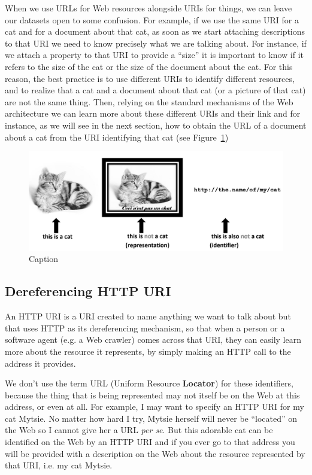 When we use URLs for Web resources alongside URIs for things, we can
leave our datasets open to some confusion. For example, if we use the
same URI for a cat and for a document about that cat, as soon as we
start attaching descriptions to that URI we need to know precisely what
we are talking about. For instance, if we attach a property to that URI
to provide a ``size'' it is important to know if it refers to the size of the
cat or the size of the document about the cat. For this reason, the best
practice is to use different URIs to identify different resources, and
to realize that a cat and a document about that cat (or a picture of
that cat) are not the same thing. Then, relying on the standard
mechanisms of the Web architecture we can learn more about these
different URIs and their link and for instance, as we will see in the
next section, how to obtain the URL of a document about a cat from the
URI identifying that cat (see Figure~\ref{fig:ch5.cats})

\begin{figure}
    \centering
    \includegraphics[width=5in]{media/ch5/WebAndCats.jpg}
    \caption{Caption}
    \label{fig:ch5.cats}
\end{figure}

\hypertarget{dereferencing-http-uri}{%
\subsection{Dereferencing HTTP URI }\label{dereferencing-http-uri}}

An HTTP URI is a URI created to name anything we want to talk about but
that uses  HTTP   as its dereferencing mechanism,  so that when a person or a
software agent (e.g. a Web crawler) comes across that URI, they can easily learn more
about the resource it represents,  by simply making an HTTP call
to the address it provides.

We don't use the term URL (Uniform Resource \textbf{Locator}) for these identifiers, because the thing that is being
represented may not itself be on the Web at this address, or even at all. For example, I
may want to specify an HTTP URI for my cat Mytsie. No matter how hard I
try, Mytsie herself will never be ``located'' on the Web so I cannot give
her a URL \emph{per se}. But this adorable cat can be identified on the
Web by an HTTP URI and if you ever go to that address you will be
provided with a description on the Web about the resource represented by
that URI, i.e. my cat Mytsie.

